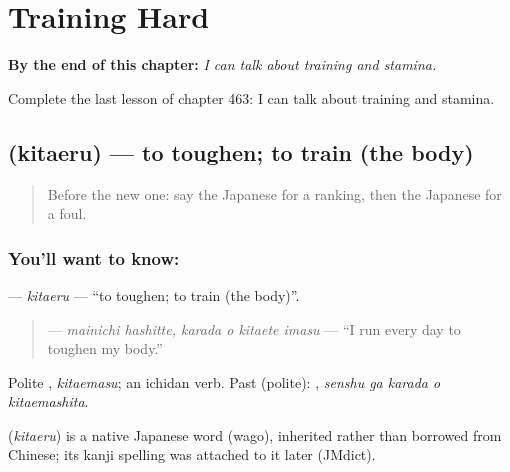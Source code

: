 
\chapter{Training Hard}
\label{ch:ja-training-hard}

\begin{chapteropening}
\textbf{By the end of this chapter:} \emph{I can talk about training and stamina.}

Complete the last lesson of chapter 463: I can talk about training and stamina.
\end{chapteropening}

\section[\texorpdfstring{\ja{きたえる} (kitaeru)}{きたえる (kitaeru)}]{ (kitaeru) — to toughen; to train (the body)}

\label{lesson:JA-C463-kitaeru}



\begin{quote}
Before the new one: say the Japanese for a ranking, then the Japanese for a foul.
\end{quote}

\subsection*{You'll want to know: }
\textbf{} — \emph{kitaeru} — \textquotedblleft{}to toughen; to train (the body)\textquotedblright{}.

\begin{quote}
\textbf{  } — \emph{mainichi hashitte, karada o kitaete imasu} — \textquotedblleft{}I run every day to toughen my body.\textquotedblright{}
\end{quote}

Polite \textbf{}, \emph{kitaemasu}; an ichidan verb. Past (polite): \textbf{  }, \emph{senshu ga karada o kitaemashita}.

\begin{cousinweb}
\textbf{} (\emph{kitaeru}) is a native Japanese word (wago), inherited rather than borrowed from Chinese; its kanji spelling was attached to it later (JMdict).
\end{cousinweb}

